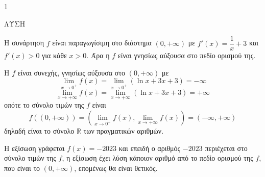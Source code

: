 \begin{ylh}{1}
    \item [Ύλη από εικόνα]
\end{ylh}
ΛΥΣΗ

\begin{alist}
    \item Η συνάρτηση $f$ είναι παραγωγίσιμη στο διάστημα $(0, +\infty)$ με $f'(x)=\dfrac{1}{x}+3$ και $f'(x)>0$ για κάθε $x>0$. Άρα η $f$ είναι γνησίως αύξουσα στο πεδίο ορισμού της.
    \item \begin{rlist}
        \item Η $f$ είναι συνεχής, γνησίως αύξουσα στο $(0, +\infty)$ με
        \[
        \lim_{x\to 0^+} f(x) = \lim_{x\to 0^+} (\ln x + 3x + 3) = -\infty
        \]
        \[
        \lim_{x\to +\infty} f(x) = \lim_{x\to +\infty} (\ln x + 3x + 3) = +\infty
        \]
        οπότε το σύνολο τιμών της $f$ είναι
        \[
        f((0, +\infty)) = \left(\lim_{x\to 0^+} f(x), \lim_{x\to +\infty} f(x)\right) = (-\infty, +\infty)
        \]
        δηλαδή είναι το σύνολο $\mathbb{R}$ των πραγματικών αριθμών.
        \item Η εξίσωση γράφεται $f(x)=-2023$ και επειδή ο αριθμός $-2023$ περιέχεται στο σύνολο τιμών της $f$, η εξίσωση έχει λύση κάποιον αριθμό από το πεδίο ορισμού της $f$, που είναι το $(0, +\infty)$, επομένως θα είναι θετικός.
    \end{rlist}
\end{alist}